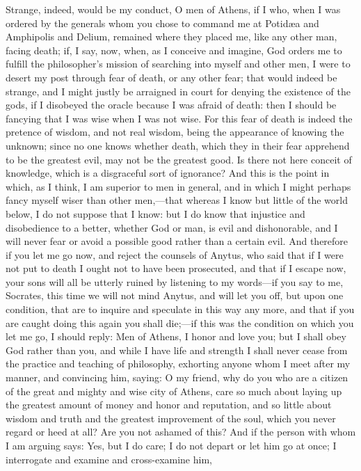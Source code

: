 \documentclass[12pt]{article}
\begin{document}
Strange, indeed, would be my conduct, O men of Athens, if I who, when
I was ordered by the generals whom you chose to command me at Potid{\ae}a
and Amphipolis and Delium, remained where they placed me, like any
other man, facing death; if, I say, now, when, as I conceive and imagine,
God orders me to fulfill the philosopher's mission of searching into
myself and other men, I were to desert my post through fear of death,
or any other fear; that would indeed be strange, and I might justly
be arraigned in court for denying the existence of the gods, if I
disobeyed the oracle because I was afraid of death: then I should
be fancying that I was wise when I was not wise. For this fear of
death is indeed the pretence of wisdom, and not real wisdom, being
the appearance of knowing the unknown; since no one knows whether
death, which they in their fear apprehend to be the greatest evil,
may not be the greatest good. Is there not here conceit of knowledge,
which is a disgraceful sort of ignorance? And this is the point in
which, as I think, I am superior to men in general, and in which I
might perhaps fancy myself wiser than other men,---that whereas I
know but little of the world below, I do not suppose that I know:
but I do know that injustice and disobedience to a better, whether
God or man, is evil and dishonorable, and I will never fear or avoid
a possible good rather than a certain evil. And therefore if you let
me go now, and reject the counsels of Anytus, who said that if I were
not put to death I ought not to have been prosecuted, and that if
I escape now, your sons will all be utterly ruined by listening to
my words---if you say to me, Socrates, this time we will not mind
Anytus, and will let you off, but upon one condition, that are to
inquire and speculate in this way any more, and that if you are caught
doing this again you shall die;---if this was the condition on which
you let me go, I should reply: Men of Athens, I honor and love you;
but I shall obey God rather than you, and while I have life and strength
I shall never cease from the practice and teaching of philosophy,
exhorting anyone whom I meet after my manner, and convincing him,
saying: O my friend, why do you who are a citizen of the great and
mighty and wise city of Athens, care so much about laying up the greatest
amount of money and honor and reputation, and so little about wisdom
and truth and the greatest improvement of the soul, which you never
regard or heed at all? Are you not ashamed of this? And if the person
with whom I am arguing says: Yes, but I do care; I do not depart or
let him go at once; I interrogate and examine and cross-examine him,
\end{document}
